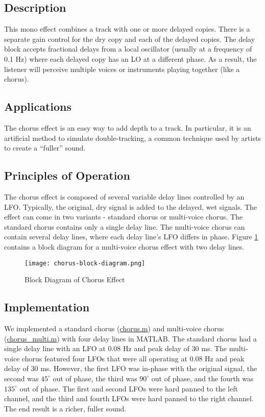 \subsection{Description}
This mono effect combines a track with one or more delayed copies. There is a separate gain control for the dry copy and each of the delayed copies. The delay block accepts fractional delays from a local oscillator (usually at a frequency of 0.1 Hz) where each delayed copy has an LO at a different phase. As a result, the listener will perceive multiple voices or instruments playing together (like a chorus).

\subsection{Applications}
The chorus effect is an easy way to add depth to a track. In particular, it is an artificial method to simulate double-tracking, a common technique used by artists to create a ``fuller'' sound.

\subsection{Principles of Operation}
The chorus effect is composed of several variable delay lines controlled by an LFO. Typically, the original, dry signal is added to the delayed, wet signals. The effect can come in two variants - standard chorus or multi-voice chorus. The standard chorus contains only a single delay line. The multi-voice chorus can contain several delay lines, where each delay line's LFO differs in phase. Figure \ref{fig:chorus-block-diagram} contains a block diagram for a multi-voice chorus effect with two delay lines.
\begin{figure}[ht]
    \centering
    \texttt{[image: chorus-block-diagram.png]}
    \caption{Block Diagram of Chorus Effect}
    \label{fig:chorus-block-diagram}
\end{figure}

\subsection{Implementation}
We implemented a standard chorus (\href{run:../chorus.m}{chorus.m}) and multi-voice chorus (\href{run:../chorus-multi.m}{chorus\_multi.m}) with four delay lines in MATLAB. The standard chorus had a single delay line with an LFO at 0.08 Hz and peak delay of 30 ms. The multi-voice chorus featured four LFOs that were all operating at 0.08 Hz and peak delay of 30 ms. However, the first LFO was in-phase with the original signal, the second was $45^\circ$ out of phase, the third was $90^\circ$ out of phase, and the fourth was $135^\circ$ out of phase. The first and second LFOs were hard panned to the left channel, and the third and fourth LFOs were hard panned to the right channel. The end result is a richer, fuller sound.

